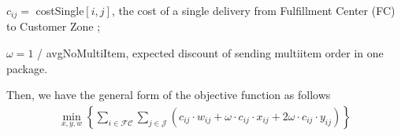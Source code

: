 \documentclass[letterpaper,10pt,english]{jupyterBook}
\begin{document}
\sphinxAtStartPar
\(c_{ij}=\) costSingle\([i,j]\), the cost of a single delivery from Fulfillment Center (FC)  to Customer Zone ;

\sphinxAtStartPar
\(\omega=1\) / avgNoMultiItem, expected discount of sending multi\sphinxhyphen{}item order in one package.

\sphinxAtStartPar
Then, we have the general form of the objective function as follows
\begin{equation*}
\begin{split}\min\limits_{x,y,w} \left\{ \sum_{i\in\mathcal{FC}} \sum_{j\in\mathcal{J}}\left(  c_{ij}\cdot w_{ij} + \omega \cdot c_{ij}\cdot x_{ij} + 2\omega \cdot c_{ij}\cdot y_{ij} \right) \right\}\end{split}
\end{equation*}
\end{document}

